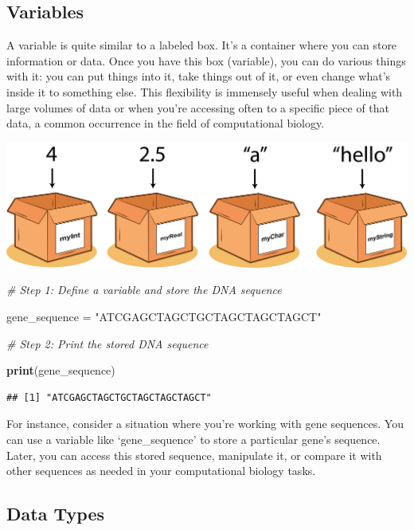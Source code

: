 \documentclass[
]{book}
\newenvironment{Shaded}{\begin{snugshade}}{\end{snugshade}}
\newcommand{\CommentTok}[1]{\textcolor[rgb]{0.56,0.35,0.01}{\textit{#1}}}
\newcommand{\FunctionTok}[1]{\textcolor[rgb]{0.13,0.29,0.53}{\textbf{#1}}}
\newcommand{\NormalTok}[1]{#1}
\newcommand{\OtherTok}[1]{\textcolor[rgb]{0.56,0.35,0.01}{#1}}
\newcommand{\StringTok}[1]{\textcolor[rgb]{0.31,0.60,0.02}{#1}}
\begin{document}
\hypertarget{variables}{%
\subsection{Variables}\label{variables}}

A variable is quite similar to a labeled box. It's a container where you can store information or data. Once you have this box (variable), you can do various things with it: you can put things into it, take things out of it, or even change what's inside it to something else. This flexibility is immensely useful when dealing with large volumes of data or when you're accessing often to a specific piece of that data, a common occurrence in the field of computational biology.

\includegraphics{images/variable.png}

\begin{Shaded}
\begin{Highlighting}[]
\CommentTok{\# Step 1: Define a variable and store the DNA sequence}

\NormalTok{gene\_sequence }\OtherTok{=} \StringTok{"ATCGAGCTAGCTGCTAGCTAGCTAGCT"}

\CommentTok{\# Step 2: Print the stored DNA sequence}

\FunctionTok{print}\NormalTok{(gene\_sequence)}
\end{Highlighting}
\end{Shaded}

\begin{verbatim}
## [1] "ATCGAGCTAGCTGCTAGCTAGCTAGCT"
\end{verbatim}

For instance, consider a situation where you're working with gene sequences. You can use a variable like `gene\_sequence' to store a particular gene's sequence. Later, you can access this stored sequence, manipulate it, or compare it with other sequences as needed in your computational biology tasks.

\hypertarget{data-types}{%
\subsection{Data Types}\label{data-types}}
\end{document}
